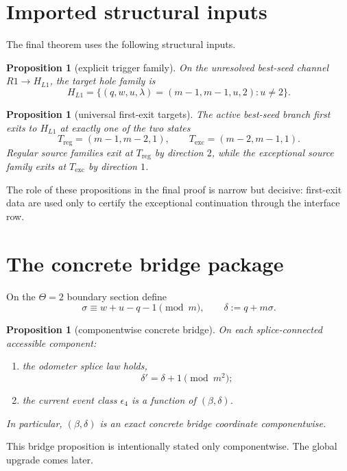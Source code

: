 \documentclass[11pt]{article}
\newtheorem{proposition}[theorem]{Proposition}
\begin{document}
\section{Imported structural inputs}

The final theorem uses the following structural inputs.

\begin{proposition}[explicit trigger family]
On the unresolved best-seed channel $R1\to H_{L1}$, the target hole family is
\[
H_{L1}=\{(q,w,u,\lambda)=(m-1,m-1,u,2):u\neq 2\}.
\]
\end{proposition}

\begin{proposition}[universal first-exit targets]
The active best-seed branch first exits to $H_{L1}$ at exactly one of the two
states
\[
T_{\mathrm{reg}}=(m-1,m-2,1),
\qquad
T_{\mathrm{exc}}=(m-2,m-1,1).
\]
Regular source families exit at $T_{\mathrm{reg}}$ by direction $2$, while the
exceptional source family exits at $T_{\mathrm{exc}}$ by direction $1$.
\end{proposition}

The role of these propositions in the final proof is narrow but decisive:
first-exit data are used only to certify the exceptional continuation through
the interface row.

\section{The concrete bridge package}

On the $\Theta=2$ boundary section define
\[
\sigma \equiv w+u-q-1 \pmod m,
\qquad
\delta := q+m\sigma.
\]

\begin{proposition}[componentwise concrete bridge]
On each splice-connected accessible component:
\begin{enumerate}[label=\textup{(\alph*)},leftmargin=2.5em]
\item the odometer splice law holds,
\[
\delta'=\delta+1 \pmod{m^2};
\]
\item the current event class $\epsilon_4$ is a function of $(\beta,\delta)$.
\end{enumerate}
In particular, $(\beta,\delta)$ is an exact concrete bridge coordinate
componentwise.
\end{proposition}

This bridge proposition is intentionally stated only componentwise. The global
upgrade comes later.
\end{document}

